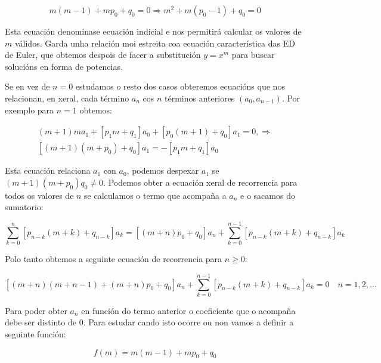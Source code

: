 \documentclass[a4paper,12pt,titlepage]{article}
\begin{document}
\begin{equation*}
    m(m-1)+m p_{0}+q_{0}=0\Rightarrow m^{2}+m\left(p_{0}-1\right)+q_{0}=0
\end{equation*}

Esta ecuación denomínase ecuación indicial e nos permitirá calcular os valores de $m$ válidos. Garda unha relación moi estreita coa ecuación característica das ED de Euler, que obtemos despois de facer a substitución $y=x^m$ para buscar solucións en forma de potencias.

\par Se en vez de $n=0$ estudamos o resto dos casos obteremos ecuacións que nos relacionan, en xeral, cada término $a_n$ cos $n$ términos anteriores $(a_0,a_{n-1})$. Por exemplo para $n=1$ obtemos:

\begin{equation*}
    \begin{gathered}
        (m+1) m a_{1}+\left[p_{1} m+q_{1}\right] a_{0}+\left[p_{0}(m+1)+q_{0}\right] a_{1}=0, \Rightarrow \\
        {\left[(m+1)\left(m+p_{0}\right)+q_{0}\right] a_{1}=-\left[p_{1} m+q_{1}\right] a_{0}}
    \end{gathered}
\end{equation*}

Esta ecuación relaciona $a_1$ con $a_0$, podemos despexar $a_1$ se $(m+1)(m+p_0)q_0 \neq 0$. Podemos obter a ecuación xeral de recorrencia para todos os valores de $n$ se calculamos o termo que acompaña a $a_n$ e o sacamos do sumatorio:

\begin{equation*}
    \sum_{k=0}^{n}\left[p_{n-k}(m+k)+q_{n-k}\right] a_{k} = [(m+n)p_0+q_0]a_n + \sum_{k=0}^{n-1}\left[p_{n-k}(m+k)+q_{n-k}\right] a_{k}
\end{equation*}

Polo tanto obtemos a seguinte ecuación de recorrencia para $n\geq 0$:

\begin{equation*}
    \left[(m+n)(m+n-1)+(m+n) p_{0}+q_{0}\right] a_{n}+\sum_{k=0}^{n-1}\left[p_{n-k}(m+k)+q_{n-k}\right] a_{k}=0 \quad n=1,2, \ldots
\end{equation*}

Para poder obter $a_n$ en función do termo anterior o coeficiente que o acompaña debe ser distinto de 0. Para estudar cando isto ocorre ou non vamos a definir a seguinte función:

\begin{equation*}
    f(m)=m(m-1)+m p_{0}+q_{0}
\end{equation*}
\end{document}
